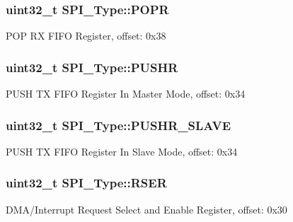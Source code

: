 \subsubsection[{\texorpdfstring{P\+O\+PR}{POPR}}]{ uint32\+\_\+t S\+P\+I\+\_\+\+Type\+::\+P\+O\+PR}\hypertarget{structSPI__Type_a05364b40687e08bc41dac6e8c36c902e}{}\label{structSPI__Type_a05364b40687e08bc41dac6e8c36c902e}
P\+OP RX F\+I\+FO Register, offset\+: 0x38 
\subsubsection[{\texorpdfstring{P\+U\+S\+HR}{PUSHR}}]{ uint32\+\_\+t S\+P\+I\+\_\+\+Type\+::\+P\+U\+S\+HR}\hypertarget{structSPI__Type_a6c80b733dbeb338bd00a076a787d1586}{}\label{structSPI__Type_a6c80b733dbeb338bd00a076a787d1586}
P\+U\+SH TX F\+I\+FO Register In Master Mode, offset\+: 0x34 
\subsubsection[{\texorpdfstring{P\+U\+S\+H\+R\+\_\+\+S\+L\+A\+VE}{PUSHR_SLAVE}}]{ uint32\+\_\+t S\+P\+I\+\_\+\+Type\+::\+P\+U\+S\+H\+R\+\_\+\+S\+L\+A\+VE}\hypertarget{structSPI__Type_a333d186477ff4f51d447d342354aaead}{}\label{structSPI__Type_a333d186477ff4f51d447d342354aaead}
P\+U\+SH TX F\+I\+FO Register In Slave Mode, offset\+: 0x34 
\subsubsection[{\texorpdfstring{R\+S\+ER}{RSER}}]{ uint32\+\_\+t S\+P\+I\+\_\+\+Type\+::\+R\+S\+ER}\hypertarget{structSPI__Type_a107d9410bde132e409d2238beea64d07}{}\label{structSPI__Type_a107d9410bde132e409d2238beea64d07}
D\+M\+A/\+Interrupt Request Select and Enable Register, offset\+: 0x30 
